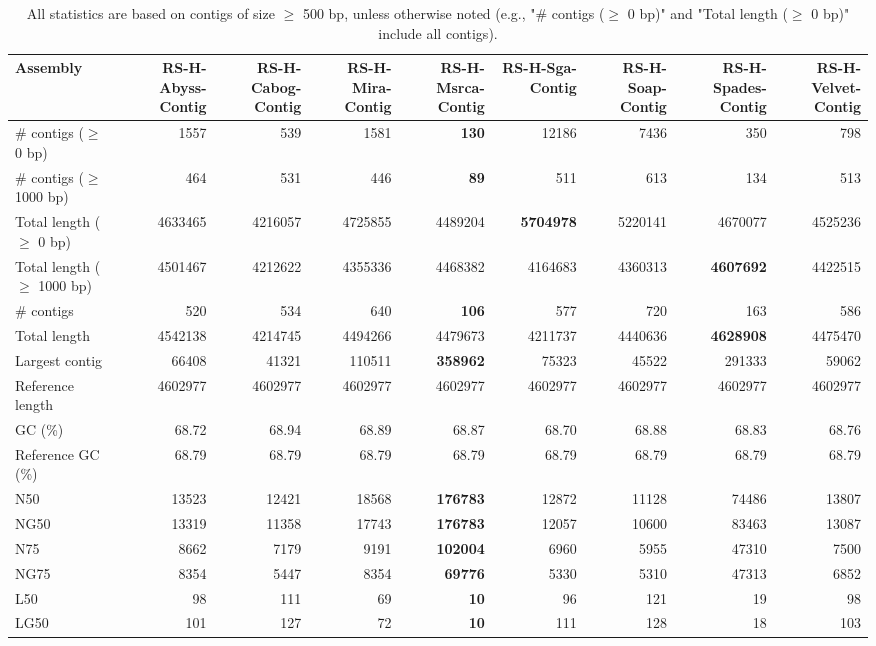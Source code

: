 \documentclass[12pt,a4paper]{article}
\begin{document}
\begin{table}[ht]
\begin{center}
\caption{All statistics are based on contigs of size $\geq$ 500 bp, unless otherwise noted (e.g., "\# contigs ($\geq$ 0 bp)" and "Total length ($\geq$ 0 bp)" include all contigs).}
\begin{tabular}{|l*{8}{|r}|}
\hline
Assembly & RS-H-Abyss-Contig & RS-H-Cabog-Contig & RS-H-Mira-Contig & RS-H-Msrca-Contig & RS-H-Sga-Contig & RS-H-Soap-Contig & RS-H-Spades-Contig & RS-H-Velvet-Contig \\ \hline
\# contigs ($\geq$ 0 bp) & 1557 & 539 & 1581 & {\bf 130} & 12186 & 7436 & 350 & 798 \\ \hline
\# contigs ($\geq$ 1000 bp) & 464 & 531 & 446 & {\bf 89} & 511 & 613 & 134 & 513 \\ \hline
Total length ($\geq$ 0 bp) & 4633465 & 4216057 & 4725855 & 4489204 & {\bf 5704978} & 5220141 & 4670077 & 4525236 \\ \hline
Total length ($\geq$ 1000 bp) & 4501467 & 4212622 & 4355336 & 4468382 & 4164683 & 4360313 & {\bf 4607692} & 4422515 \\ \hline
\# contigs & 520 & 534 & 640 & {\bf 106} & 577 & 720 & 163 & 586 \\ \hline
Total length & 4542138 & 4214745 & 4494266 & 4479673 & 4211737 & 4440636 & {\bf 4628908} & 4475470 \\ \hline
Largest contig & 66408 & 41321 & 110511 & {\bf 358962} & 75323 & 45522 & 291333 & 59062 \\ \hline
Reference length & 4602977 & 4602977 & 4602977 & 4602977 & 4602977 & 4602977 & 4602977 & 4602977 \\ \hline
GC (\%) & 68.72 & 68.94 & 68.89 & 68.87 & 68.70 & 68.88 & 68.83 & 68.76 \\ \hline
Reference GC (\%) & 68.79 & 68.79 & 68.79 & 68.79 & 68.79 & 68.79 & 68.79 & 68.79 \\ \hline
N50 & 13523 & 12421 & 18568 & {\bf 176783} & 12872 & 11128 & 74486 & 13807 \\ \hline
NG50 & 13319 & 11358 & 17743 & {\bf 176783} & 12057 & 10600 & 83463 & 13087 \\ \hline
N75 & 8662 & 7179 & 9191 & {\bf 102004} & 6960 & 5955 & 47310 & 7500 \\ \hline
NG75 & 8354 & 5447 & 8354 & {\bf 69776} & 5330 & 5310 & 47313 & 6852 \\ \hline
L50 & 98 & 111 & 69 & {\bf 10} & 96 & 121 & 19 & 98 \\ \hline
LG50 & 101 & 127 & 72 & {\bf 10} & 111 & 128 & 18 & 103 \\ \hline

\end{tabular}
\end{center}
\end{table}
\end{document}
